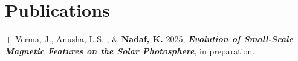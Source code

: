 \section{Publications}

\textbf{+} Verma, J., Anusha, L.S. , $\&$ \textbf{Nadaf, K.} 2025, \textbf{\textit{Evolution of Small-Scale Magnetic Features on the Solar Photosphere}}, in preparation.



